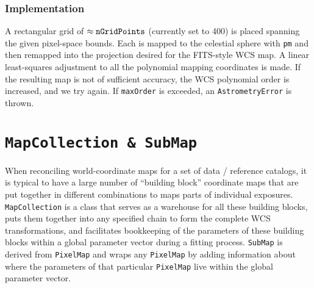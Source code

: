 \documentclass[11pt,preprint,flushrt]{aastex}
\begin{document}
\subsubsection{Implementation}
A rectangular grid of $\approx{\tt nGridPoints}$ (currently set to 400) is placed spanning the given pixel-space bounds.  Each is mapped to the celestial sphere with {\tt pm} and then remapped into the projection desired for the FITS-style WCS map.  A linear least-squares adjustment to all the polynomial mapping coordinates is made.  If the resulting map is not of sufficient accuracy, the WCS polynomial order is increased, and we try again.  If {\tt maxOrder} is exceeded, an {\tt AstrometryError} is thrown.

\section{\tt MapCollection \& SubMap}
When reconciling world-coordinate maps for a set of data / reference catalogs, it is typical to have a large number of ``building block'' coordinate maps that are put together in different combinations to maps parts of individual exposures.  {\tt MapCollection} is a class that serves as a warehouse for all these building blocks, puts them together into any specified chain to form the complete WCS transformations, and facilitates bookkeeping of the parameters of these building blocks within a global parameter vector during a fitting process.  {\tt SubMap} is derived from {\tt PixelMap} and wraps any {\tt PixelMap} by adding information about where the parameters of that particular {\tt PixelMap} live within the global parameter vector.
\end{document}

